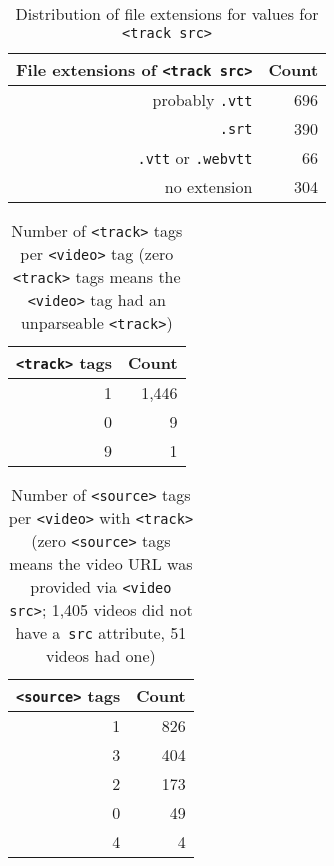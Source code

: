 \documentclass{sig-alternate}
\begin{document}
\begin{table}[p]
  \centering
  \begin{tabular}{ r | r }                       
    File extensions of \texttt{<track src>} & Count \\
    \hline
    probably \texttt{.vtt} & 696\\
    \texttt{.srt} & 390\\
    \texttt{.vtt} or \texttt{.webvtt} & 66\\
    no extension & 304\\
  \end{tabular}
  \caption{Distribution of file extensions for
    values for \texttt{<track src>}}
  \label{table:src}    
\end{table}

\begin{table}[p]
  \centering
  \begin{tabular}{ r | r }                       
    \texttt{<track>} tags & Count \\
    \hline
    1 & 1,446\\
    0 & 9\\
    9 & 1\\
  \end{tabular}
  \caption{Number of \texttt{<track>} tags per
    \texttt{<video>} tag \tiny (zero \texttt{<track>}
    tags means  the \texttt{<video>} tag had
    an  unparseable \texttt{<track>})}
  \label{table:track}    
\end{table}

\begin{table}[p]
  \centering
  \begin{tabular}{ r | r }
    \texttt{<source>} tags & Count \\
    \hline
    1 & 826\\    
    3 & 404\\    
    2 & 173\\    
    0 & 49\\
    4 & 4\\
  \end{tabular}
  \caption{Number of \texttt{<source>} tags per
    \texttt{<video>} with \texttt{<track>} \tiny (zero \texttt{<source>}
    tags means the video URL was provided via
    \texttt{<video src>}; 1,405 videos did not have
    a~\texttt{src} attribute, 51 videos had one)}
  \label{table:source}    
\end{table}
\end{document}
